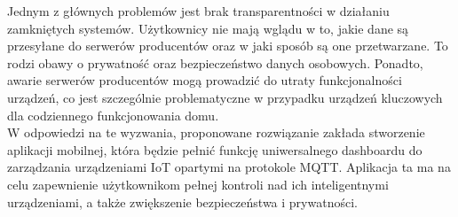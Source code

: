 Jednym z głównych problemów jest brak transparentności w działaniu zamkniętych systemów. Użytkownicy nie mają wglądu w to, jakie dane są przesyłane do serwerów producentów oraz w jaki sposób są one przetwarzane. To rodzi obawy o prywatność oraz bezpieczeństwo danych osobowych. Ponadto, awarie serwerów producentów mogą prowadzić do utraty funkcjonalności urządzeń, co jest szczególnie problematyczne w przypadku urządzeń kluczowych dla codziennego funkcjonowania domu.\\

W odpowiedzi na te wyzwania, proponowane rozwiązanie zakłada stworzenie aplikacji mobilnej, która będzie pełnić funkcję uniwersalnego dashboardu do zarządzania urządzeniami IoT opartymi na protokole MQTT. Aplikacja ta ma na celu zapewnienie użytkownikom pełnej kontroli nad ich inteligentnymi urządzeniami, a także zwiększenie bezpieczeństwa i prywatności.